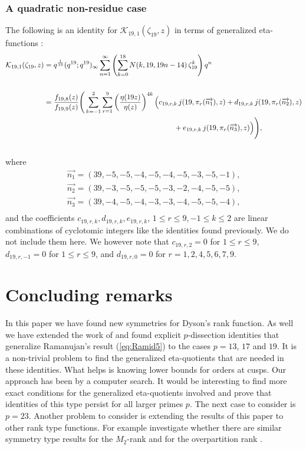 \documentclass[12pt]{amsart}
\theoremstyle{definition}
\theoremstyle{remark}
\numberwithin{equation}{section}
\newcommand\Lpar[1]{\left(#1\right)}
\newcommand\eqn[1]{(\ref{eq:#1})}
\begin{document}
\subsubsection{\textbf{A quadratic non-residue case}}
The following is an identity for $\mathcal{K}_{19,1}(\zeta_{19},z)$ in terms of generalized eta-functions :
\\
\begin{align}
\mathcal{K}_{19,1}(\zeta_{19},z)&=q^{\frac{1}{19}}(q^{19};q^{19})_\infty \sum_{n=1}^\infty \Lpar{\sum_{k=0}^{18} N(k,19,19n-14)\,\zeta_{19}^k}q^n \label{eq:rank19id3} \\
\nonumber
\\
&=\frac{f_{19,8}(z)}{f_{19,9}(z)}\Bigg(\sum_{k=-1}^{2}\sum_{r=1}^{9} \left(\dfrac{\eta(19z)}{\eta(z)}\right)^{4k}\Big(c_{19,r,k}\,j(19,\pi_r(\overrightarrow{n_1}),z)+d_{19,r,k}\,j(19,\pi_r(\overrightarrow{n_2}),z)
\\
\nonumber
&\hspace{63mm}+e_{19,r,k}\,j(19,\pi_r(\overrightarrow{n_3}),z)\Big)\Bigg),
\nonumber
\\
\nonumber
\end{align}
where\\
\begin{align*}
\overrightarrow{n_1}=(39, -5, -5, -4, -5, -4, -5, -3, -5, -1),
\\
\overrightarrow{n_2}=(39, -3, -5, -5, -5, -3, -2, -4, -5, -5),
\\
\overrightarrow{n_3}=(39, -4, -5, -4, -3, -3, -4, -5, -5, -4),\\
\end{align*}
and the coefficients $c_{19,r,k}, d_{19,r,k}, e_{19,r,k}$, $1\leq r \leq 9, -1\leq k \leq 2$ are linear combinations of cyclotomic integers like the identities found previously. We do not include them here. We however note that $c_{19,r,2}=0$ for $1 \leq r \leq 9$, $d_{19,r,-1}=0$ for $1 \leq r \leq 9$, and $d_{19,r,0}=0$ for $r=1,2,4,5,6,7,9$. 


\section{Concluding remarks}
\label{sec:conclusion}
In this paper we have found new symmetries for Dyson's rank function.
As well we have extended the work of \cite{Ga19a} and found explicit 
$p$-dissection identities that generalize Ramanujan's result \eqn{Ramid5}
to the cases $p=13$, $17$ and $19$.  It is a non-trivial problem to
find the generalized eta-quotients that are needed in these identities.
What helps is knowing lower bounds for orders at cusps. Our approach
has been by a computer search. It would be interesting to find more
exact conditions for the generalized eta-quotients involved and prove
that identities of this type persist for all larger primes $p$.
The next case to consider is $p=23$.  Another problem to consider
is extending the results of this paper to other rank type functions.
For example investigate whether there are similar symmetry type
results for the $M_2$-rank \cite{Be-Ga02} and for the
overpartition rank \cite{Lo2005}.
\end{document}
